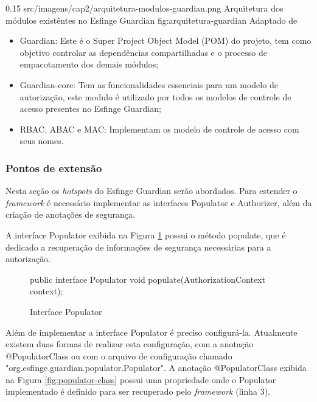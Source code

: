 \begin{image}
{0.15} %
{src/imagens/cap2/arquitetura-modulos-guardian.png} %
{Arquitetura dos módulos existêntes no Esfinge Guardian} %
{fig:arquitetura-guardian} %
{Adaptado de } %
\end{image}

\begin{itemize}
    \item Guardian: Este é o Super Project Object Model (POM)  do projeto, tem como objetivo controlar as dependências compartilhadas e o processo de empacotamento dos demais módulos;
    
    \item Guardian-core: Tem as funcionalidades essenciais para um modelo de autorização, este modulo é utilizado por todos os modelos de controle de acesso presentes no Esfinge Guardian;
    
    \item RBAC, ABAC e MAC: Implementam os modelo de controle de acesso com seus nomes.
 
\end{itemize}

\subsubsection{\label{sc:extensao-guardian}Pontos de extensão}

\par Nesta seção os \textit{hotspots} do Esfinge Guardian serão abordados. Para estender o \textit{framework} é necessário implementar as interfaces Populator e Authorizer, além da criação de anotações de segurança.

\par A interface Populator exibida na Figura \ref{fig:interface-populator} possui o método populate, que é dedicado a recuperação de informações de segurança necessárias para a autorização. 

\begin{figure}[H]
    \centering
    \caption{Interface Populator}
    \begin{java}
public interface Populator {
	void populate(AuthorizationContext context);
}
    \end{java}
    \label{fig:interface-populator}
\end{figure}

\par Além de implementar a interface Populator é preciso configurá-la. Atualmente existem duas formas de realizar esta configuração, com a anotação @PopulatorClass ou com o arquivo de configuração chamado "org.esfinge.guardian.populator.Populator". A anotação @PopulatorClass exibida na Figura \ref{fig:populator-class} possui uma propriedade onde o Populator implementado é definido para ser recuperado pelo \textit{framework} (linha 3).

